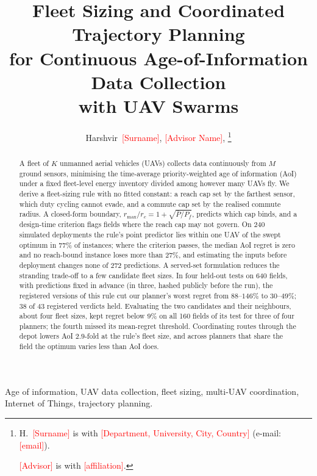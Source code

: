 \documentclass[journal,outdir=./]{IEEEtran}
\newcommand{\rmax}{r_{\max}}
\newcommand{\rc}{r_{c}}
\newcommand{\Pbar}{\bar{P}}
\newcommand{\Pf}{P_{f}}
\newcommand{\todo}[1]{\textcolor{red}{[#1]}}
\begin{document}
\title{Fleet Sizing and Coordinated Trajectory Planning\\ for Continuous Age-of-Information Data Collection\\ with UAV Swarms}

\author{Harshvir~\todo{Surname},
        \todo{Advisor Name}, 
\thanks{H.~\todo{Surname} is with \todo{Department, University, City, Country} (e-mail: \todo{email}).
\par \todo{Advisor} is with \todo{affiliation}.}}

\maketitle

\begin{abstract}
A fleet of $K$ unmanned aerial vehicles (UAVs) collects data continuously from $M$ ground sensors, minimising the time-average priority-weighted age of information (AoI) under a fixed fleet-level energy inventory divided among however many UAVs fly. We derive a fleet-sizing rule with no fitted constant: a reach cap set by the farthest sensor, which duty cycling cannot evade, and a commute cap set by the realised commute radius. A closed-form boundary, $\rmax/\rc=1+\sqrt{\Pbar/\Pf}$, predicts which cap binds, and a design-time criterion flags fields where the reach cap may not govern. On 240 simulated deployments the rule's point predictor lies within one UAV of the swept optimum in $77\%$ of instances; where the criterion passes, the median AoI regret is zero and no reach-bound instance loses more than $27\%$, and estimating the inputs before deployment changes none of 272 predictions. A served-set formulation reduces the stranding trade-off to a few candidate fleet sizes. In four held-out tests on 640 fields, with predictions fixed in advance (in three, hashed publicly before the run), the registered versions of this rule cut our planner's worst regret from $88$--$146\%$ to $30$--$49\%$; 38 of 43 registered verdicts held. Evaluating the two candidates and their neighbours, about four fleet sizes, kept regret below $9\%$ on all 160 fields of its test for three of four planners; the fourth missed its mean-regret threshold. Coordinating routes through the depot lowers AoI $2.9$-fold at the rule's fleet size, and across planners that share the field the optimum varies less than AoI does.
\end{abstract}

\begin{IEEEkeywords}
Age of information, UAV data collection, fleet sizing, multi-UAV coordination, Internet of Things, trajectory planning.
\end{IEEEkeywords}
\end{document}
